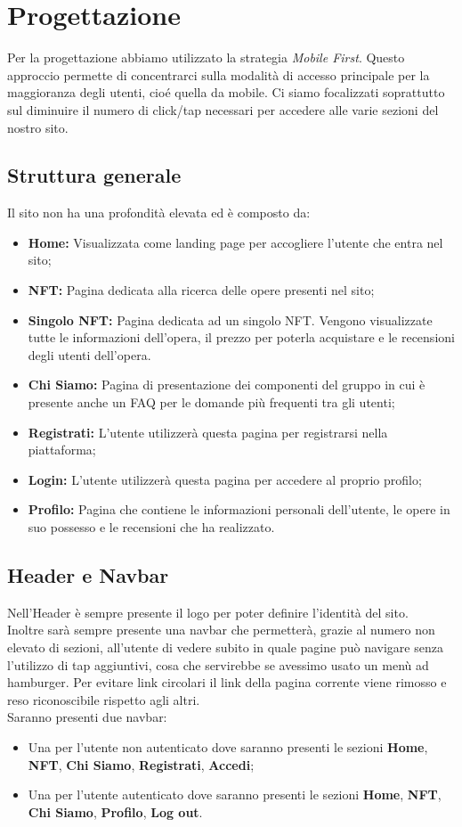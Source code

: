 \documentclass[10pt]{article}
\begin{document}
\section{Progettazione}
Per la progettazione abbiamo utilizzato la strategia \textit{Mobile First}. Questo approccio permette di concentrarci sulla modalità di accesso principale per la maggioranza degli utenti, cioé quella da mobile. Ci siamo focalizzati soprattutto sul diminuire il numero di click/tap necessari per accedere alle varie sezioni del nostro sito.
\subsection{Struttura generale}
Il sito non ha una profondità elevata ed è composto da:
\begin{itemize}
\item \textbf{Home:} Visualizzata come landing page per accogliere l'utente che entra nel sito;
\item \textbf{NFT:} Pagina dedicata alla ricerca delle opere presenti nel sito;
\item \textbf{Singolo NFT:} Pagina dedicata ad un singolo NFT. Vengono visualizzate tutte le informazioni dell'opera, il prezzo per poterla acquistare e le recensioni degli utenti dell'opera. 
\item \textbf{Chi Siamo:} Pagina di presentazione dei componenti del gruppo in cui è presente anche un FAQ per le domande più frequenti tra gli utenti;
\item \textbf{Registrati:} L'utente utilizzerà questa pagina per registrarsi nella piattaforma;
\item \textbf{Login:} L'utente utilizzerà questa pagina per accedere al proprio profilo;
\item \textbf{Profilo:} Pagina che contiene le informazioni personali dell'utente, le opere in suo possesso e le recensioni che ha realizzato.
\end{itemize}

\subsection{Header e Navbar}
Nell'Header è sempre presente il logo per poter definire l'identità del sito.\\
Inoltre sarà sempre presente una navbar che permetterà, grazie al numero non elevato di sezioni, all'utente di vedere subito in quale pagine può navigare senza l'utilizzo di tap aggiuntivi, cosa che servirebbe se avessimo usato un menù ad hamburger. Per evitare link circolari il link della pagina corrente viene rimosso e reso riconoscibile rispetto agli altri.\\
Saranno presenti due navbar:
\begin{itemize}
\item Una per l'utente non autenticato dove saranno presenti le sezioni \textbf{Home}, \textbf{NFT}, \textbf{Chi Siamo}, \textbf{Registrati}, \textbf{Accedi};
\item Una per l'utente autenticato dove saranno presenti le sezioni \textbf{Home}, \textbf{NFT}, \textbf{Chi Siamo}, \textbf{Profilo}, \textbf{Log out}. 
\end{itemize}
\end{document}
